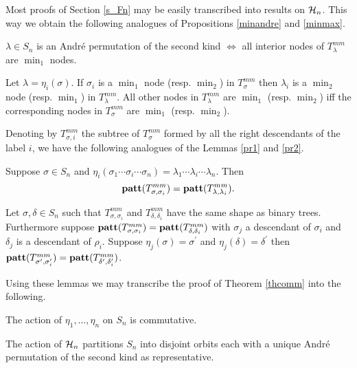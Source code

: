 Most proofs of Section \ref{s_Fn} may be easily transcribed into results
on ${\cal H}_n$. This way we obtain the following analogues of
Propositions \ref{minandre} and \ref{minmax}.

\begin{prop}
$\lambda \in S_n$ is an Andr\'e permutation of the second kind
$\Leftrightarrow$ all interior nodes of $T_\lambda^{mm}$ are $\min_1$ nodes.
\end{prop}

\begin{prop}
Let $\lambda = \eta_i(\sigma)$.  If 
$\sigma_i$ is a $\min_1$ node (resp. $\min_2$) in $T_{\sigma}^{mm}$ then
$\lambda_i$ is a  $\min_2$ node (resp. $\min_1$)  in $T_{\lambda}^{mm}$.  All other nodes in $T_\lambda^{mm}$
are  $\min_1$ (resp. $\min_2$) iff the corresponding nodes in $T_\sigma^{mm}$ are $\min_1$ (resp. $\min_2$).
\end{prop}

Denoting by $T^{mm}_{\sigma,i}$ the subtree of $T^{mm}_\sigma$ formed 
by all the right descendants of the label $i$, we have the following
analogues of the Lemmas \ref{pr1} and \ref{pr2}.

\begin{lemma}
Suppose  $\sigma \in S_n$ and  
$\eta_i(\sigma_1\cdots\sigma_i\cdots\sigma_n)=
\lambda_1\cdots\lambda_i\cdots\lambda_n  $.
Then 
$${\bf patt}(T^{mm}_{\sigma,\sigma_i}) = {\bf patt}(T^{mm}_{\lambda,\lambda_i}).$$
\end{lemma}

\begin{lemma}
Let $\sigma, \delta \in S_n$ such that $T^{mm}_{\sigma,\sigma_i}$ and $T^{mm}_{\delta,\delta_i}$ have the same shape as binary trees.
Furthermore  suppose ${\bf patt}(T^{mm}_{\sigma,\sigma_i}) =
{\bf patt}(T^{mm}_{\delta,\delta_i})$ with $\sigma_j$ a descendant of $\sigma_i$ and $\delta_j$ is a descendant of $\rho_i$.
Suppose $\eta_j(\sigma) = \sigma^\prime$
and $\eta_j(\delta) = \delta^\prime$
then ${\bf patt}(T^{mm}_ {\sigma^\prime,\sigma_i^\prime}) =
 {\bf patt}(T^{mm}_{\delta^\prime,\delta_i^\prime})$.
\end{lemma}
Using these lemmas we may transcribe the proof of Theorem
\ref{thcomm} into the following.

\begin{prop}
The action of $\eta_1,\ldots, \eta_n$ on $S_n$ is commutative.
\end{prop} 

\begin{corollary}
The action of ${\cal H}_n$ partitions $S_n$ into disjoint orbits
each with a unique Andr\'e permutation of the second kind as representative.
\end{corollary}

